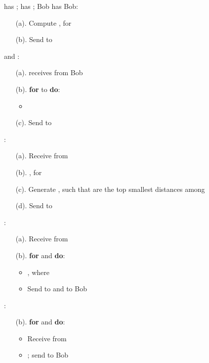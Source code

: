 \documentclass{article}
\begin{document}
\begin{algorithm}[!htbp]
\begin{algorithmic}[1]
\REQUIRE  has ;  has ; Bob has 
\STATE  Bob:
\begin{enumerate}\itemsep=0pt
     \item[(a).] Compute , for      
     \item[(b).] Send  to 
\end{enumerate}

\STATE  and :
\begin{enumerate}\itemsep=0pt
     \item[(a).]  receives  from Bob
     \item[(b).] \textbf{for}  to  \textbf{do}: 
\begin{itemize}
      \item 
\end {itemize}     
\item[(c).] Send  to 
  \end{enumerate}

\STATE :
\begin{enumerate}\itemsep=0pt
     \item[(a).] Receive  from 
     \item[(b).] , for 
\item[(c).] Generate , such that 
 are the top  smallest distances among 
     \item[(d).] Send  to   
 \end{enumerate}

\STATE :
\begin{enumerate}\itemsep=0pt
     \item[(a).] Receive  from 
     \item[(b).] \textbf{for}  and  \textbf{do}:
       \begin{itemize}
                 \item , where 
                 \item Send  to  and  to Bob   
       \end{itemize}            
\end{enumerate}

\STATE :
\begin{enumerate}\itemsep=0pt
\item[(b).] \textbf{for}  and  \textbf{do}:
       \begin{itemize}
                \item Receive  from 
                \item ; send  to Bob 
       \end{itemize}           
 \end{enumerate}


\end{algorithmic}
\end{algorithm}
\end{document}
